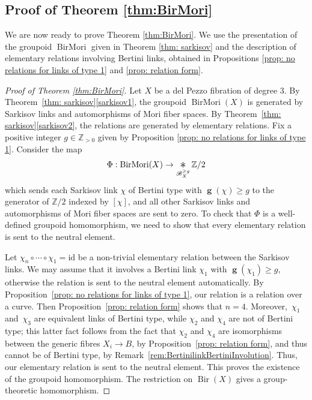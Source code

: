 \documentclass[11pt]{article}
\numberwithin{equation}{section}
\DeclareMathOperator{\Bir}{Bir}
\DeclareMathOperator{\inv}{\boldsymbol{g}}
\DeclareMathOperator{\BirMori}{BirMori}
\theoremstyle{plain}
\theoremstyle{definition}
\newcommand{\id}{\mathrm{id}}
\newcommand{\ZZ}{\mathbb Z}
\newcommand{\Bertini}{\mathscr B}
\newcommand{\bigast}{\mathop{\mathchoice{\vcenter{\hbox{\scalebox{1.5}{$\ast$}}}}{\ast}{\ast}{\ast}}}
\begin{document}
\subsection{Proof of Theorem \ref{thm:BirMori}}\label{sec: existence of hom}

We are now ready to prove Theorem \ref{thm:BirMori}. We use the presentation of the groupoid $\BirMori$ given in Theorem \ref{thm: sarkisov} and the description of elementary relations involving Bertini links, obtained in Propositions \ref{prop: no relations for links of type 1} and \ref{prop: relation form}.

\begin{proof}[Proof of Theorem \ref{thm:BirMori}]
Let $X$ be a del Pezzo fibration of degree $3$. By Theorem~\ref{thm: sarkisov}\eqref{sarkisov1}, the groupoid $\BirMori(X)$ is generated by Sarkisov links and automorphisms of Mori fiber spaces. By Theorem~\ref{thm: sarkisov}\eqref{sarkisov2}, the relations are generated by elementary relations. Fix a positive integer $g\in\ZZ_{>0}$ given by Proposition \ref{prop: no relations for links of type 1}. Consider the map\enlargethispage{\baselineskip}%
\[
\Phi: \BirMori(X)\to \bigast\limits_{\Bertini_X^{\ge g}} \ZZ/2
\]
which sends each Sarkisov link $\chi$ of Bertini type with $\inv(\chi)\ge g$ to the generator of $\ZZ/2$ indexed by $[\chi]$, and all other Sarkisov links and automorphisms of Mori fiber spaces are sent to zero. To check that $\Phi$ is a well-defined groupoid homomorphism, we need to show that every elementary relation is sent to the neutral element.

Let $\chi_n\circ\cdots\circ\chi_1=\id$
be a non-trivial elementary relation between the Sarkisov links. We may assume that it involves a Bertini link $\chi_1$ with $\inv(\chi_1)\ge g$, otherwise the relation is sent to the neutral element automatically. By Proposition~\ref{prop: no relations for links of type 1}, our relation is a relation over a curve. Then Proposition~\ref{prop: relation form} shows that $n=4$. Moreover,~$\chi_1$ and~$\chi_3$ are equivalent links of Bertini type, while $\chi_2$ and $\chi_4$ are not of Bertini type; this latter fact follows from the fact that $\chi_2$ and $\chi_4$ are isomorphisms between the generic fibres $X_i\to B$, by Proposition~\ref{prop: relation form}, and thus cannot be of Bertini type, by Remark~\ref{rem:BertinilinkBertiniInvolution}. Thus, our elementary relation is sent to the neutral element. This proves the existence of the groupoid homomorphism. The restriction on $\Bir(X)$ gives a group-theoretic homomorphism.
\end{proof}
\end{document}
